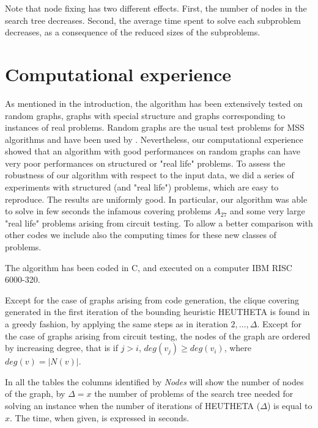 Note that node fixing has two different effects. First, the
number of nodes in the search tree decreases. Second, the average
time spent to solve each subproblem decreases, as a consequence of
the reduced sizes of the subproblems. 


\section{Computational experience}
\label{se-comp}
\def\DD{$\Delta = $}
As mentioned in the introduction, the algorithm has been
extensively tested on random graphs, graphs with special structure 
and graphs corresponding to instances of real problems. Random
graphs are the usual test problems for MSS algorithms and have been
used by \cite{Ba90,BaTi90,BaYu86,CaPa90,FrHeWe90}. Nevertheless, our
computational experience showed that an algorithm with good
performances on random graphs can have very poor performances on
structured or "real life" problems. To assess the robustness of our
algorithm with respect to the input data, we did a series of
experiments with structured (and "real life") problems, which are
easy to reproduce. The results are uniformly good. In particular,
our algorithm was able to solve in
few seconds the infamous covering problems
$A_{27}$ and some very large "real life" problems arising
from circuit testing. To allow a better comparison with other codes
we include also the computing times for these new classes of
problems. 

 The algorithm has been coded in C, and executed on a computer IBM 
RISC 6000-320. 

Except for the case of graphs arising from code generation, the
clique covering generated in the first iteration of the bounding
heuristic HEUTHETA is found in a greedy fashion, by applying the same
steps as in iteration $2,\dots,\Delta$. Except for the case
of graphs arising from circuit testing, the nodes of the graph are
ordered by increasing degree, that is if $j > i$, $deg(v_j) \geq
deg(v_i)$, where $deg(v) = |N(v)|$. 

In all the tables the columns identified by {\em Nodes} will
show the number of nodes of the graph, by $\Delta = x$ the
number of problems of the search tree needed for solving an instance
when the number of iterations of HEUTHETA ($\Delta$) is equal to
$x$.  The time, when given, is expressed in seconds. 
